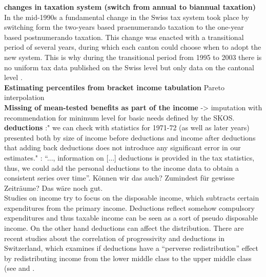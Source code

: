\documentclass[twoside]{article}\usepackage[]{graphicx}\usepackage[]{color}
\begin{document}
\begin{multicols}{2}
\textbf{changes in taxation system  (switch from annual to biannual taxation)} In the mid-1990s a fundamental change in the Swiss tax system took place by switching form the two-years based praenumerando taxation to the one-year based postnumerando taxation. This change was enacted with a transitional period of several years, during which each canton could choose when to adopt the new system.  This is why during the transitional period from 1995 to 2003 there is no uniform tax data published on the Swiss level but only data on the cantonal level \citep[8f]{foellmi_volatile_2013}. \\

\textbf{Estimating percentiles from bracket income tabulation} Pareto interpolation \\ 

\textbf{Missing of mean-tested benefits as part of the income} -> imputation with recommendation for minimum level for basic needs defined by the SKOS.\\

\textbf{deductions} \citet[477]{dell_income_2007}:" we can check with statistics for 1971-72 (as well as later years) presented both by size of income before deductions and income after deductions that adding back deductions does not introduce any significant error in our estimates."
\citet[5]{schaltegger_evolution_2011}: ``..., information on [...] deductions is provided in the tax statistics, thus, we could add the personal deductions to the income data to obtain a consistent series over time''. Können wir das auch? Zumindest für gewisse Zeiträume? Das wäre noch gut. \\

Studies on income try to focus on the disposable income, which subtracts certain expenditures from the primary income. Deductions reflect somehow compulsory expenditures and thus taxable income can be seen as a sort of pseudo disposable income. On the other hand deductions can affect the distribution. There are recent studies about the correlation of progressivity and deductions in Switzerland, which examines if deductions have a ``perverse redistribution'' effect by redistributing income from the lower middle class to the upper middle class (see \citealt{peters_steuerabzuge:_2011} and \citet{Interpellation Barbara Gysel (2009) FEHLT. das interpellation barbara sieht falsch aus}.


\end{multicols}
\end{document}
